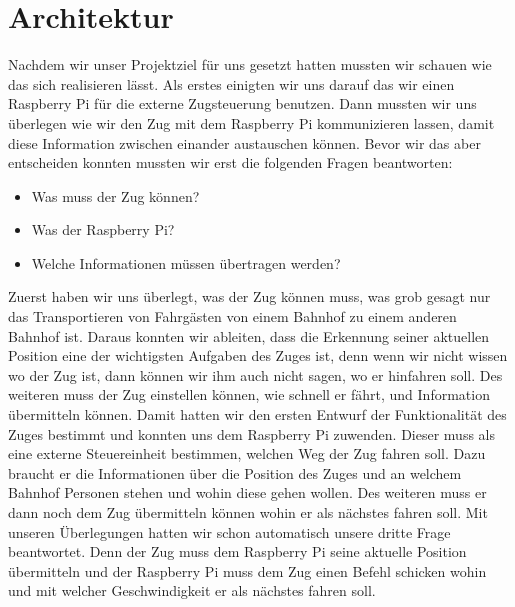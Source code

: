 \chapter{Architektur}
Nachdem wir unser Projektziel für uns gesetzt hatten mussten wir schauen wie das sich realisieren lässt. Als erstes einigten wir uns darauf das wir einen Raspberry Pi für die externe Zugsteuerung benutzen. Dann mussten wir uns überlegen wie wir den Zug mit dem Raspberry Pi kommunizieren lassen, damit diese Information zwischen einander austauschen können. Bevor wir das aber entscheiden konnten mussten wir erst die folgenden Fragen beantworten:
\begin{itemize}
\item Was muss der Zug können?
\item Was der Raspberry Pi?
\item Welche Informationen müssen übertragen werden? 
\end{itemize}
Zuerst haben wir uns überlegt, was der Zug können muss, was grob gesagt nur das Transportieren von Fahrgästen von einem Bahnhof zu einem anderen Bahnhof ist. Daraus konnten wir ableiten, dass die Erkennung seiner aktuellen Position eine der wichtigsten Aufgaben des Zuges ist, denn wenn wir nicht wissen wo der Zug ist, dann können wir ihm auch nicht sagen, wo er hinfahren soll. Des weiteren muss der Zug einstellen können, wie schnell er fährt, und Information übermitteln können. Damit hatten wir den ersten Entwurf der Funktionalität des Zuges bestimmt und konnten uns dem Raspberry Pi zuwenden. Dieser muss als eine externe Steuereinheit bestimmen, welchen Weg der Zug fahren soll. Dazu braucht er die Informationen über die Position des Zuges und an welchem Bahnhof Personen stehen und wohin diese gehen wollen. Des weiteren muss er dann noch dem Zug übermitteln können wohin er als nächstes fahren soll. Mit unseren Überlegungen hatten wir schon automatisch unsere dritte Frage beantwortet. Denn der Zug muss dem Raspberry Pi seine aktuelle Position übermitteln und der Raspberry Pi muss dem Zug einen Befehl schicken wohin und mit welcher Geschwindigkeit er als nächstes fahren soll. 

